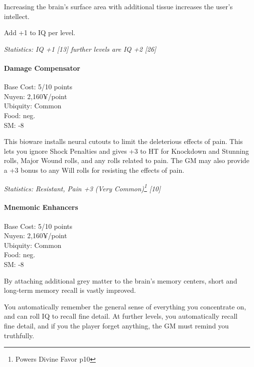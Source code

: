 \begin{multicols*}{3}
	Increasing the brain's surface area with additional tissue increases the user's intellect. 
	
	Add +1 to IQ per level. 
	
	\textit{\textcolor{OliveGreen}{Statistics: IQ +1 [13] further levels are IQ +2 [26]}}
	
	\paragraph{Damage Compensator}
	\begin{flushright}
		Base Cost: 5/10 points\\
		Nuyen: 2,160¥/point\\
		Ubiquity: Common\\
		Food: neg.\\
		SM: -8\\
	\end{flushright}
	
	This bioware installs neural cutouts to limit the deleterious effects of pain. This lets you ignore Shock Penalties and gives +3 to HT for Knockdown and Stunning rolls, Major Wound rolls, and any rolls related to pain. The GM may also provide a +3 bonus to any Will rolls for resisting the effects of pain.
	
	\textit{\textcolor{OliveGreen}{Statistics: Resistant, Pain +3 (Very Common)\footnote{Powers Divine Favor p10} [10]}}
	
	\paragraph{Mnemonic Enhancers}
	\begin{flushright}
		Base Cost: 5/10 points\\
		Nuyen: 2,160¥/point\\
		Ubiquity: Common\\
		Food: neg.\\
		SM: -8\\
	\end{flushright}
	
	By attaching additional grey matter to the brain's memory centers, short and long-term memory recall is vastly improved. 
	
	You automatically remember the general sense of everything you concentrate on, and can roll IQ to recall fine detail. At further levels, you automatically recall fine detail, and if you the player forget anything, the GM must remind you truthfully. 
	

\end{multicols*}
